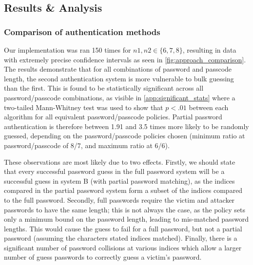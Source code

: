 \documentclass[british,10pt,a4paper]{article}
\begin{document}
\subsection{Results \& Analysis}
\subsubsection{Comparison of authentication methods}
\label{subsec:authentication_methods}
Our implementation was ran 150 times for $n1, n2 \in \{6,7,8\}$, resulting in data with extremely precise confidence intervals as seen in \autoref{fig:approach_comparison}. The results demonstrate that for all combinations of password and passcode length, the second authentication system is more vulnerable to bulk guessing than the first. This is found to be statistically significant across all password/passcode combinations, as visible in \autoref{app:significant_stats} where a two-tailed Mann-Whitney test was used to show that $p<.01$ between each algorithm for all equivalent password/passcode policies. Partial password authentication is therefore between 1.91 and 3.5 times more likely to be randomly guessed, depending on the password/passcode policies chosen (minimum ratio at password/passcode of 8/7, and maximum ratio at 6/6). 

These observations are most likely due to two effects. Firstly, we should state that every successful password guess in the full password system will be a successful guess in system B (with partial password matching), as the indices compared in the partial password system form a subset of the indices compared to the full password. Secondly, full passwords require the victim and attacker passwords to have the same length; this is not always the case, as the policy sets only a minimum bound on the password length, leading to mis-matched password lengths. This would cause the guess to fail for a full password, but not a partial password (assuming the characters stated indices matched). Finally, there is a significant number of password collisions at various indices which allow a larger number of guess passwords to correctly guess a victim's password. 
\end{document}
